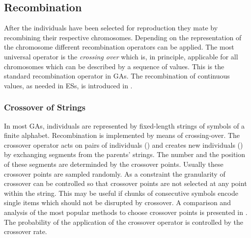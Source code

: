 %
%

	\subsection{Recombination}

After the individuals have been selected for reproduction they mate by
recombining their respective chromosomes.  Depending on the
representation of the chromosome different
recombination operators can be applied. The most
universal operator is the \emph{crossing over} which is, in principle,
applicable for all chromosomes which can be described by a sequence of
values.  This is the standard recombination operator in GAs.  The
recombination of continuous values, as needed in ESs, is introduced in
.


	\subsubsection{Crossover of Strings}

In most GAs, individuals are represented by fixed-length strings of
symbols of a finite alphabet.
Recombination is implemented by means of crossing-over.
The crossover operator acts on pairs
of individuals () and creates new individuals
() by exchanging segments from the parents' strings.
The number and the position of these segments are determinded by the
crossover points.
Usually these crossover points are sampled randomly.
As a constraint the granularity
of crossover can be controlled so that
crossover points are not selected at any point within the string.
This may be useful if chunks of consecutive symbols encode single items which
should not be disrupted by crossover.
A comparison and analysis of the most popular methods to choose
crossover points is presented in \cite{Spears:91b}.
The probability of the application of the crossover operator is
controlled by the crossover rate.

